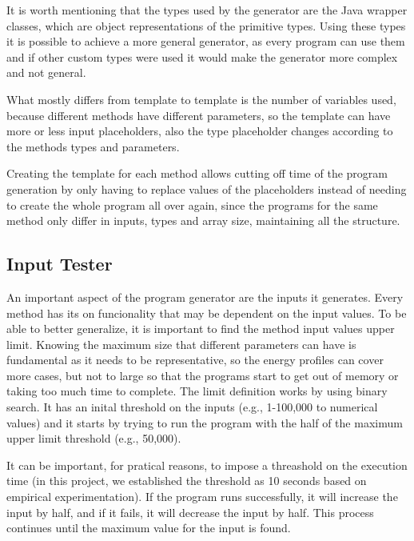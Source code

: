 It is worth mentioning that the types used by the generator are the Java wrapper classes, which are object representations of the primitive types. Using these types it is possible to achieve a more general generator, as every program can use them and if other custom types were used it would make the generator more complex and not general.

What mostly differs from template to template is the number of variables used, because different methods have different parameters, so the template can have more or less input placeholders, also the type placeholder changes according to the methods types and parameters.


Creating the template for each method allows cutting off time of the program generation by only having to replace values of the placeholders instead of needing to create the whole program all over again, since the programs for the same method only differ in inputs, types and array size, maintaining all the structure.

\subsection{Input Tester} \label{sec:work_stage1_input_tester}

An important aspect of the program generator are the inputs it generates. Every method has its on funcionality that may be dependent on the input values.  To be able to better generalize, it is important to find the method input values upper limit. Knowing the maximum size that different parameters can have is fundamental as it needs to be representative, so the energy profiles can cover more cases, but not to large so that the programs start to get out of memory or taking too much time to complete.
The limit definition works by using binary search. It has an inital threshold on the inputs (e.g., 1-100,000 to numerical values) and it starts by trying to run the program with the half of the maximum upper limit threshold (e.g., 50,000). 

It can be important, for pratical reasons, to impose a threashold on the execution time (in this project, we established the threshold as 10 seconds based on empirical experimentation). If the program runs successfully, it will increase the input by half, and if it fails, it will decrease the input by half. This process continues until the maximum value for the input is found.

